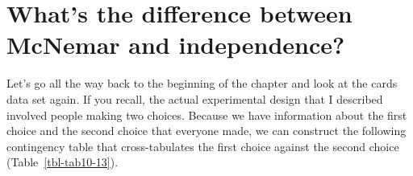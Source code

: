 \documentclass[
  a4paper,
]{book}
\begin{document}
\hypertarget{whats-the-difference-between-mcnemar-and-independence}{%
\section{What's the difference between McNemar and
independence?}\label{whats-the-difference-between-mcnemar-and-independence}}

Let's go all the way back to the beginning of the chapter and look at
the cards data set again. If you recall, the actual experimental design
that I described involved people making two choices. Because we have
information about the first choice and the second choice that everyone
made, we can construct the following contingency table that
cross-tabulates the first choice against the second choice
(Table~\ref{tbl-tab10-13}).

\hypertarget{tbl-tab10-13}{}
 
  \providecommand{\huxb}[2]{\arrayrulecolor[RGB]{#1}\global\arrayrulewidth=#2pt}
  \providecommand{\huxvb}[2]{\color[RGB]{#1}\vrule width #2pt}
  \providecommand{\huxtpad}[1]{\rule{0pt}{#1}}
  \providecommand{\huxbpad}[1]{\rule[-#1]{0pt}{#1}}
\end{document}

